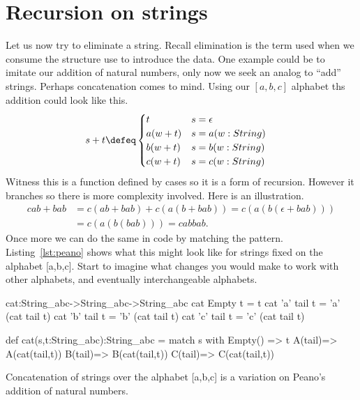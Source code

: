 
\section{Recursion on strings}
Let us now try to eliminate a string.  Recall elimination is the term used 
when we consume the structure use to introduce the data.  One example could be to imitate 
our addition of natural numbers, only now we seek an analog to ``add''
strings.  Perhaps concatenation comes to mind.  Using our $[a,b,c]$ 
alphabet ths addition could look like this.
\begin{align*}
    s+t & \defeq \begin{cases}
        t & s=\epsilon\\
        a(w+t) & s= a(w:String)\\
        b(w+t) & s= b(w:String)\\
        c(w+t) & s= c(w:String)\\
    \end{cases}
\end{align*}
Witness this is a function defined by cases so it is a form of recursion.
However it branches so there is more complexity involved.   Here is an 
illustration.
\begin{align*}
    cab+bab & = c(ab+bab)+c(a(b+bab))=c(a(b(\epsilon+bab)))\\
        & = c(a(b(bab)))=cabbab.
\end{align*}
Once more we can do the same in code by matching the pattern.
Listing~\ref{lst:peano} shows what this might look like for 
strings fixed on the alphabet [a,b,c].  Start to imagine what 
changes you would make to work with other alphabets, and 
eventually interchangeable alphabets.
\begin{lstfloat}
\begin{center}
\begin{Fcode}[]
cat:String_abc->String_abc->String_abc
cat Empty t   = t
cat 'a' tail t = 'a' (cat tail t)
cat 'b' tail t = 'b' (cat tail t)
cat 'c' tail t = 'c' (cat tail t)
\end{Fcode}
\begin{Pcode}[]
def cat(s,t:String_abc):String_abc =
  match s with 
    Empty() => t
    A(tail)=> A(cat(tail,t))
    B(tail)=> B(cat(tail,t))
    C(tail)=> C(cat(tail,t))
\end{Pcode}
\end{center}
\caption{Concatenation of strings over the alphabet [a,b,c] is a variation on 
Peano's addition of natural numbers.}
\label{lst:peano-elim}
\end{lstfloat}

